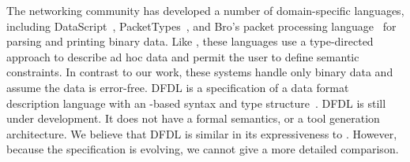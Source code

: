 



The networking community has developed a number of domain-specific
languages, including DataScript~\cite{gpce02}, PacketTypes~\cite{sigcomm00},
and Bro's packet processing
language~\cite{paxson:bro} for parsing and printing binary data.  
Like \padsml{}, these
languages use a type-directed approach to describe ad hoc data and
permit the user to define semantic constraints.  In contrast to our
work, these systems handle only binary data and assume the data is
error-free. DFDL is a specification of a data
format description language with an \xml{}-based syntax and type
structure~\cite{dfdl-proposal,dfdl-primer}. DFDL is still under development.   
It does not have a formal semantics, or a tool
generation architecture. We believe that
DFDL is similar in its expressiveness to \padsc{}.  However, because
the specification is evolving, we cannot give a more
detailed comparison.

